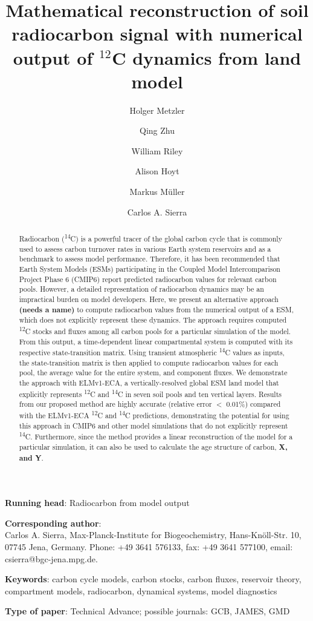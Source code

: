 \documentclass[11pt,a4paper]{article}
\title{\bf Mathematical reconstruction  of soil radiocarbon signal with numerical output of $^{12}$C dynamics from land model}
\author[1]{Holger Metzler}
\author[2]{Qing Zhu}
\author[2]{William Riley}
\author[1]{Alison Hoyt}
\author[1]{Markus M\"uller}
\author[1]{Carlos A. Sierra}
\affil[1]{\it \small Max Planck Institute for Biogeochemistry, Hans-Kn\"oll-Str. 10, 07745 Jena, Germany}
\affil[2]{\it Climate and Ecosystem Sciences Division, Lawrence Berkeley National Laboratory, Berkeley 94720, USA}
\date{}
\begin{document}
\doublespace
\maketitle

\noindent
{\bf Running head}: Radiocarbon from model output

\vspace{2em}

\noindent
\textbf{Corresponding author}: \\ Carlos A. Sierra, Max-Planck-Institute for Biogeochemistry, Hans-Kn\"{o}ll-Str. 10, 07745 Jena, Germany. Phone: +49 3641 576133, fax: +49 3641 577100, email: csierra@bgc-jena.mpg.de.

\vspace{2em}

\noindent
{\bf Keywords}: carbon cycle models, carbon stocks, carbon fluxes, reservoir theory, compartment models, radiocarbon, dynamical systems,  model diagnostics

\vspace{2em}

\noindent
{\bf Type of paper}: Technical Advance; possible journals: GCB, JAMES, GMD
\newpage
\linenumbers

\begin{abstract}
Radiocarbon (\textsuperscript{14}C) is a powerful tracer of the global carbon cycle that is commonly used to assess carbon turnover rates in various Earth system reservoirs and as a benchmark to assess model performance. Therefore, it has been recommended that Earth System Models (ESMs) participating in the Coupled Model Intercomparison Project Phase 6 (CMIP6) report predicted radiocarbon values for relevant carbon pools. However, a detailed representation of radiocarbon dynamics may be an impractical burden on model developers. Here, we present an alternative approach \textbf{(needs a name)} to compute radiocarbon values from the numerical output of a ESM, which does not explicitly represent these dynamics. The approach requires computed \textsuperscript{12}C stocks and fluxes among all carbon pools for a particular simulation of the model. From this output, a time-dependent linear compartmental system is computed with its respective state-transition matrix. Using transient atmospheric \textsuperscript{14}C values as inputs, the state-transition matrix is then applied to compute radiocarbon values for each pool, the average value for the entire system, and component fluxes. We demonstrate the approach with ELMv1-ECA, a vertically-resolved global ESM land model that explicitly represents \textsuperscript{12}C and \textsuperscript{14}C in seven soil pools and ten vertical layers. Results from our proposed method are highly accurate (relative error $<$ 0.01\%) compared with the ELMv1-ECA \textsuperscript{12}C and \textsuperscript{14}C predictions, demonstrating the potential for using this approach in CMIP6 and other model simulations that do not explicitly represent \textsuperscript{14}C. Furthermore, since the method provides a linear reconstruction of the model for a particular simulation, it can also be used to calculate the age structure of carbon, \textbf{X, and Y}.
\end{abstract}
\end{document}
